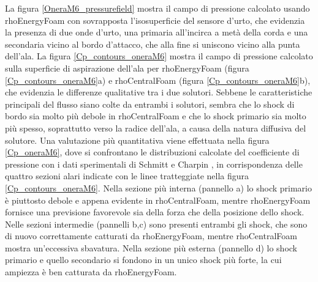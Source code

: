 \documentclass[a5paper]{sapthesis}
\begin{document}
	La figura \ref{OneraM6_pressurefield} mostra il campo di pressione calcolato usando rhoEnergyFoam con sovrapposta l'isosuperficie del sensore d'urto, che evidenzia la presenza di due onde d'urto, una primaria all'incirca a metà della corda e una secondaria vicino al bordo d'attacco, che alla fine si uniscono vicino alla punta dell'ala. La figura \ref{Cp_contours_oneraM6} mostra il campo di pressione calcolato sulla superficie di aspirazione dell'ala per rhoEnergyFoam (figura \ref{Cp_contours_oneraM6}a) e rhoCentralFoam (figura \ref{Cp_contours_oneraM6}b), che evidenzia le differenze qualitative tra i due solutori. Sebbene le caratteristiche principali del ﬂusso siano colte da entrambi i solutori, sembra che lo shock di bordo sia molto più debole in rhoCentralFoam e che lo shock primario sia molto più spesso, soprattutto verso la radice dell'ala, a causa della natura diffusiva del solutore. Una valutazione più quantitativa viene effettuata nella figura \ref{Cp_oneraM6}, dove si confrontano le distribuzioni calcolate del coefficiente di pressione con i dati sperimentali di Schmitt e Charpin \citep{schmitt1979pressure}, in corrispondenza delle quattro sezioni alari indicate con le linee tratteggiate nella figura \ref{Cp_contours_oneraM6}. Nella sezione più interna (pannello a) lo shock primario è piuttosto debole e appena evidente in rhoCentralFoam, mentre rhoEnergyFoam fornisce una previsione favorevole sia della forza che della posizione dello shock. Nelle sezioni intermedie (pannelli b,c) sono presenti entrambi gli shock, che sono di nuovo correttamente catturati da rhoEnergyFoam, mentre rhoCentralFoam mostra un'eccessiva sbavatura. Nella sezione più esterna (pannello d) lo shock primario e quello secondario si fondono in un unico shock più forte, la cui ampiezza è ben catturata da rhoEnergyFoam. 
	
\end{document}
